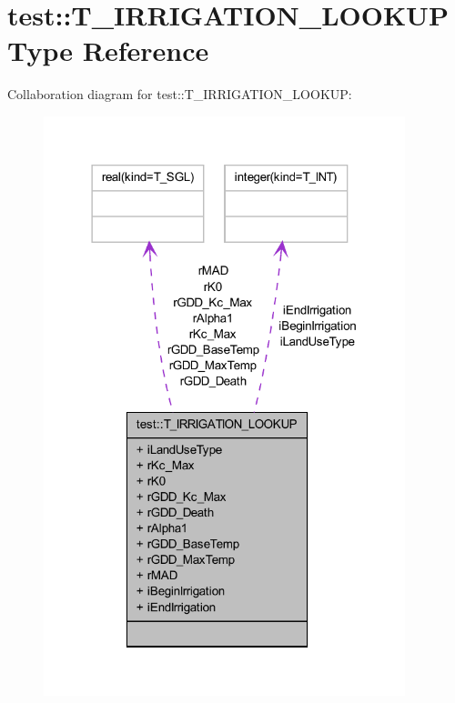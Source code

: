 \hypertarget{typetest_1_1_t___i_r_r_i_g_a_t_i_o_n___l_o_o_k_u_p}{
\section{test::T\_\-IRRIGATION\_\-LOOKUP Type Reference}
\label{typetest_1_1_t___i_r_r_i_g_a_t_i_o_n___l_o_o_k_u_p}
}


Collaboration diagram for test::T\_\-IRRIGATION\_\-LOOKUP:\nopagebreak
\begin{figure}[H]
\begin{center}
\leavevmode
\includegraphics[width=298pt]{typetest_1_1_t___i_r_r_i_g_a_t_i_o_n___l_o_o_k_u_p__coll__graph}
\end{center}
\end{figure}
